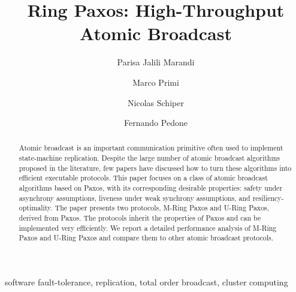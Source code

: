 \documentclass[final,3p,times,twocolumn,authoryear]{elsarticle}
\begin{document}
\begin{frontmatter}





\title{Ring Paxos: High-Throughput Atomic Broadcast }







\author{Parisa Jalili Marandi}
\author{Marco Primi}
\author{Nicolas Schiper}
\author{Fernando Pedone}



\begin{abstract}
Atomic broadcast is an important communication primitive often used to implement state-machine replication. 
Despite the large number of atomic broadcast algorithms proposed in the literature, few papers have discussed how to turn these algorithms into efficient executable protocols. 
This paper focuses on a class of atomic broadcast algorithms based on Paxos, with its corresponding desirable properties: safety under asynchrony assumptions, liveness under weak synchrony assumptions, and resiliency-optimality.
The paper presents two protocols, M-Ring Paxos and U-Ring Paxos, derived from Paxos. 
The protocols inherit the properties of Paxos and can be implemented very efficiently. 
We report a detailed performance analysis of M-Ring Paxos and U-Ring Paxos and compare them to other atomic broadcast protocols.

\end{abstract}

\begin{keyword}
software fault-tolerance, replication, total order broadcast, cluster computing
\end{keyword}

\end{frontmatter}
\end{document}
